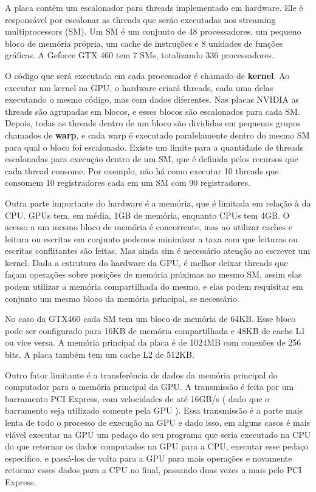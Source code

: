 A placa contém um escalonador para threads implementado em hardware. Ele é responsável por escalonar as threads que serão
executadas nos streaming multiprocessors (SM). Um SM é um conjunto de 48 processadores, um pequeno bloco de memória própria,
um cache de instruções e 8 unidades de funções gráficas. A Geforce GTX 460 tem 7 SMs, totalizando 336 processadores.

O código que será executado em cada processador é chamado de \textbf{kernel}. Ao executar um kernel na GPU, o 
hardware criará threads, cada uma delas executando o mesmo código, mas com dados diferentes. Nas placas NVIDIA as threads 
são agrupadas em blocos, e esses blocos são escalonados para cada SM. Depois, todas as threads dentro de um bloco são 
divididas em pequenos grupos chamados de \textbf{warp}\cite{paulo}, e cada warp é executado paralelamente dentro do 
mesmo SM para qual o bloco foi escalonado. Existe um limite para a quantidade de threads escalonadas para execução
dentro de um SM, que é definida pelos recursos que cada thread consome. Por exemplo, não há como executar 10 threads
que consomem 10 registradores cada em um SM com 90 registradores.

Outra parte importante do hardware é a memória, que é limitada em relação à da CPU. GPUs tem, em média, 1GB
de memória, enquanto CPUs tem 4GB. O acesso a um mesmo bloco de memória é concorrente, mas ao utilizar caches e leitura ou escritas em
conjunto podemos minimizar a taxa com que leituras ou escritas conflitantes são feitas. Mas ainda sim é necessário atenção ao escrever um
kernel. Dada a estrutura do hardware da GPU, é melhor deixar threads que façam operações sobre posições de memória próximas no mesmo
SM, assim elas podem utilizar a memória compartilhada do mesmo, e elas podem requisitar em conjunto um mesmo bloco da memória principal,
se necessário.

No caso da GTX460 cada SM tem um bloco de memória de 64KB. Esse bloco pode ser configurado para 16KB de memória compartilhada e 48KB
de cache L1 ou vice versa. A memória principal da placa é de 1024MB com conexões de 256 bits. A placa também tem um
cache L2 de 512KB.

Outro fator limitante é a transferência de dados da memória principal do computador para a memória 
principal da GPU. A transmissão é feita por um barramento PCI Express, com velocidades de até 16GB/s ( dado que o
barramento seja utilizado somente pela GPU ). Essa transmissão é a parte mais lenta de todo o
processo de execução na GPU e dado isso, em alguns casos é mais viável executar na GPU um pedaço do seu programa que seria executado
na CPU do que retornar os dados computados na GPU para a CPU, executar esse pedaço especifico, e passá-los de volta para a GPU 
para mais operações e novamente retornar esses dados para a CPU no final, passando duas vezes a mais pelo PCI Express. 

